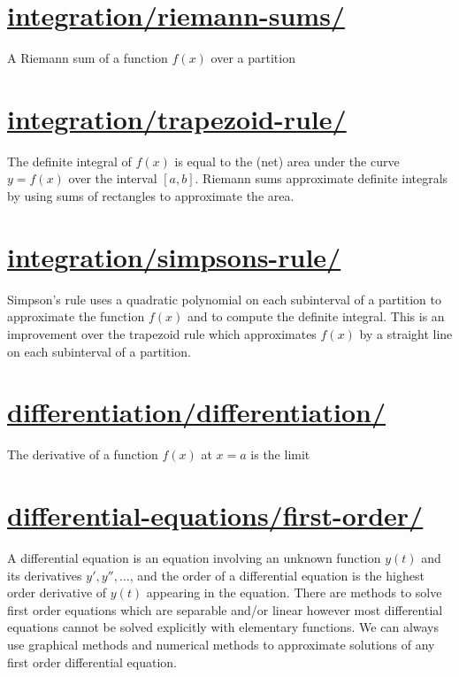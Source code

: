 \documentclass[12pt]{article}
\begin{document}
\section{\href{https://patrickwalls.github.io/mathematicalpython/integration/riemann-sums/}{integration/riemann-sums/}}
A Riemann sum of a function $f(x)$ over a partition
\vspace{1cm}
\section{\href{https://patrickwalls.github.io/mathematicalpython/integration/trapezoid-rule/}{integration/trapezoid-rule/}}
The definite integral of $f(x)$ is equal to the (net) area under the curve $y=f(x)$ over the interval $[a,b]$. Riemann sums approximate definite integrals by using sums of rectangles to approximate the area.
\vspace{1cm}
\section{\href{https://patrickwalls.github.io/mathematicalpython/integration/simpsons-rule/}{integration/simpsons-rule/}}
Simpson's rule uses a quadratic polynomial on each subinterval of a partition to approximate the function $f(x)$ and to compute the definite integral. This is an improvement over the trapezoid rule which approximates $f(x)$ by a straight line on each subinterval of a partition.
\vspace{1cm}
\section{\href{https://patrickwalls.github.io/mathematicalpython/differentiation/differentiation/}{differentiation/differentiation/}}
The derivative of a function $f(x)$ at $x=a$ is the limit
\vspace{1cm}
\section{\href{https://patrickwalls.github.io/mathematicalpython/differential-equations/first-order/}{differential-equations/first-order/}}
A differential equation is an equation involving an unknown function $y(t)$ and its derivatives $y',y'',\dots$, and the order of a differential equation is the highest order derivative of $y(t)$ appearing in the equation. There are methods to solve first order equations which are separable and/or linear however most differential equations cannot be solved explicitly with elementary functions. We can always use graphical methods and numerical methods to approximate solutions of any first order differential equation.
\vspace{1cm}
\end{document}
